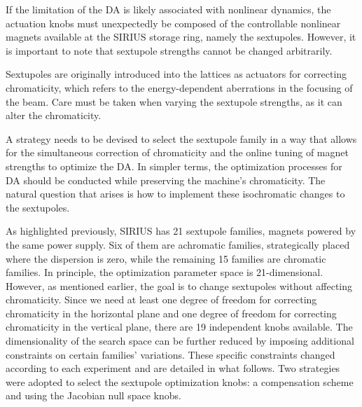 If the limitation of the DA is likely associated with nonlinear dynamics, the actuation knobs must unexpectedly be composed of the controllable nonlinear magnets available at the SIRIUS storage ring, namely the sextupoles. However, it is important to note that sextupole strengths cannot be changed arbitrarily.

Sextupoles are originally introduced into the lattices as actuators for correcting chromaticity, which refers to the energy-dependent aberrations in the focusing of the beam. Care must be taken when varying the sextupole strengths, as it can alter the chromaticity.

A strategy needs to be devised to select the sextupole family in a way that allows for the simultaneous correction of chromaticity and the online tuning of magnet strengths to optimize the DA. In simpler terms, the optimization processes for DA should be conducted while preserving the machine's chromaticity. The natural question that arises is how to implement these isochromatic changes to the sextupoles.

As highlighted previously, SIRIUS has 21 sextupole families, magnets powered by the same power supply. Six of them are achromatic families, strategically placed where the dispersion is zero, while the remaining 15 families are chromatic families. In principle, the optimization parameter space is 21-dimensional. However, as mentioned earlier, the goal is to change sextupoles without affecting chromaticity. Since we need at least one degree of freedom for correcting chromaticity in the horizontal plane and one degree of freedom for correcting chromaticity in the vertical plane, there are 19 independent knobs available. The dimensionality of the search space can be further reduced by imposing additional constraints on certain families' variations. These specific constraints changed according to each experiment and are detailed in what follows. Two strategies were adopted to select the sextupole optimization knobs: a compensation scheme and using the Jacobian null space knobs.

